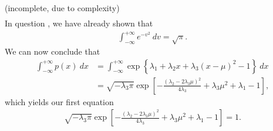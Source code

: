 \begin{answer}{(incomplete, due to complexity)}
\begin{align}
	\end{align}
	In question , we have already shown that
	\begin{align}
		\int_{-\infty}^{+\infty} e^{-v^2}\ dv = \sqrt{\pi}.
	\end{align}
	We can now conclude that
	\begin{align}
		\int_{-\infty}^{+\infty} p(x)\ dx &= \int_{-\infty}^{+\infty} \exp\left\{ \lambda_1 + \lambda_2 x + \lambda_3(x-\mu)^2 - 1 \right\}\ dx\\
		&= \sqrt{-\lambda_3\pi}\exp\left[ -\frac{(\lambda_2 - 2\lambda_3\mu)^2}{4\lambda_3} + \lambda_3 \mu^2 + \lambda_1 - 1 \right], \label{1.34eqn5}
	\end{align}
	which yields our first equation
	\begin{align}
		\sqrt{-\lambda_3\pi}\exp\left[ -\frac{(\lambda_2 - 2\lambda_3\mu)^2}{4\lambda_3} + \lambda_3 \mu^2 + \lambda_1 - 1 \right] = 1.
	\end{align}


\end{answer}
